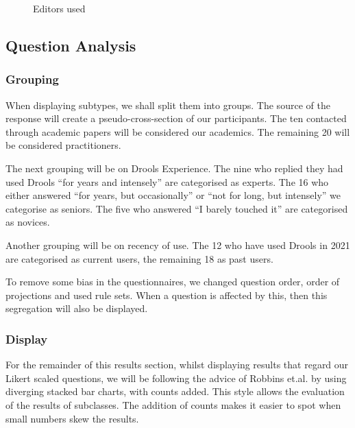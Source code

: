 \begin{figure}[h]
    \centering
    \caption{Editors used}
    \label{fig:editorUsage}
\end{figure}

\subsection{Question Analysis}

\subsubsection{Grouping}
When displaying subtypes, we shall split them into groups.
The source of the response will create a pseudo-cross-section of our participants.
The ten contacted through academic papers will be considered our academics.
The remaining 20 will be considered practitioners.

The next grouping will be on Drools Experience.
The nine who replied they had used Drools ``for years and intensely'' are categorised as experts.
The 16 who either answered ``for years, but occasionally'' or ``not for long, but intensely'' we categorise as seniors.
The five who answered ``I barely touched it'' are categorised as novices.

Another grouping will be on recency of use.
The 12 who have used Drools in 2021 are categorised as current users, the remaining 18 as past users.

To remove some bias in the questionnaires, we changed question order, order of projections and used rule sets.
When a question is affected by this, then this segregation will also be displayed.

\subsubsection{Display}
For the remainder of this results section, whilst displaying results that regard our Likert scaled questions, we will be following the advice of Robbins et.al.\cite{robbins2011plotting} by using diverging stacked bar charts, with counts added.
This style allows the evaluation of the results of subclasses.
The addition of counts makes it easier to spot when small numbers skew the results.

